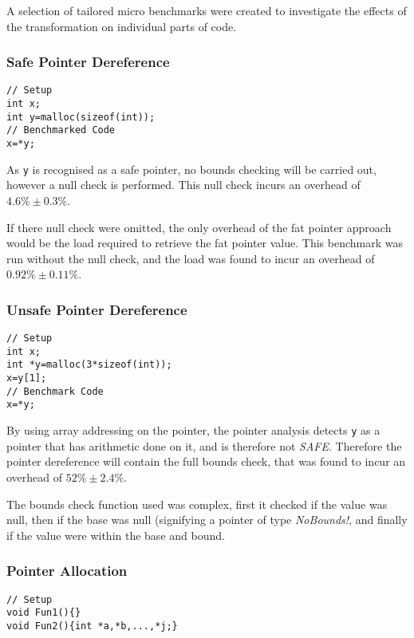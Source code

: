 A selection of tailored micro benchmarks were created to investigate the effects of the transformation on individual parts of code.

\subsubsection{Safe Pointer Dereference}

\begin{verbatim}
// Setup
int x;
int y=malloc(sizeof(int));
// Benchmarked Code
x=*y;
\end{verbatim}

As \verb!y! is recognised as a safe pointer, no bounds checking will be carried out, however a null check is performed.
This null check incurs an overhead of $4.6\% \pm 0.3\%$.

If there null check were omitted, the only overhead of the fat pointer approach would be the load required to retrieve the fat pointer value.
This benchmark was run without the null check, and the load was found to incur an overhead of $0.92\% \pm 0.11\%$.

\subsubsection{Unsafe Pointer Dereference}

\begin{verbatim}
// Setup
int x;
int *y=malloc(3*sizeof(int));
x=y[1];
// Benchmark Code
x=*y;
\end{verbatim}

By using array addressing on the pointer, the pointer analysis detects \verb!y! as a pointer that has arithmetic done on it, and is therefore not \textit{SAFE}.
Therefore the pointer dereference will contain the full bounds check, that was found to incur an overhead of $52\% \pm 2.4\%$.

The bounds check function used was complex, first it checked if the value was null, then if the base was null (signifying a pointer of type \textit{NoBounds!}, and finally if the value were within the base and bound.

\subsubsection{Pointer Allocation}

\begin{verbatim}
// Setup
void Fun1(){}
void Fun2(){int *a,*b,...,*j;}
\end{verbatim}

